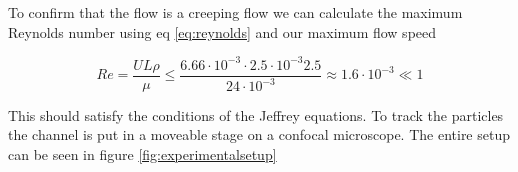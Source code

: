             
To confirm that the flow is a creeping flow we can calculate the maximum Reynolds number using eq \ref{eq:reynolds} and our maximum flow speed 

\begin{equation}
Re = \frac{U L \rho}{\mu} 
\leq \frac{6.66\cdot 10^{-3} \cdot 2.5 \cdot 10^{-3} 2.5 }{24 \cdot 10^{-3}} 
\approx	 	1.6  \cdot 10^{-3} \ll 1
\end{equation}

This should satisfy the conditions of the Jeffrey equations. To track the particles the channel is put in a moveable stage on a confocal microscope. The entire setup can be seen in figure \ref{fig:experimentalsetup}


